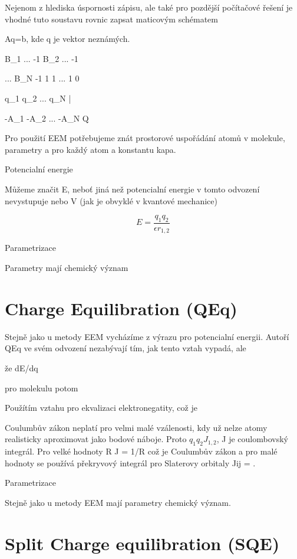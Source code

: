 \documentclass[10pt,draft,oneside]{fithesis2}
\begin{document}
Nejenom z hlediska úspornosti zápisu, ale také pro pozdější počítačové řešení je vhodné tuto soustavu rovnic zapsat maticovým schématem

Aq=b, kde q je vektor neznámých.

B_1  ...  -1
 B_2 ...  -1

  ... B_N -1
1 1 ... 1 0

q_1
q_2
...
q_N
\bar{\xi}

-A_1
-A_2
...
-A_N
Q



Pro použití EEM potřebujeme znát prostorové uspořádání atomů v molekule, parametry a pro každý atom a konstantu kapa.

Potencialní energie

Můžeme značit E, neboť jiná než potencialní energie v tomto odvození nevystupuje nebo V (jak je obvyklé v kvantové mechanice)

$$E=\frac{q_1 q_2}{\epsilon r_{1,2}}$$

Parametrizace

Parametry mají chemický význam

\section{Charge Equilibration (QEq)}

Stejně jako u metody EEM vycházíme z výrazu pro potencialní energii. Autoří QEq ve svém odvození nezabývají tím, jak tento vztah vypadá, ale 

že dE/dq

pro molekulu potom


Použítím vztahu pro ekvalizaci elektronegatity, což je 

Coulumbův zákon neplatí pro velmi malé vzálenosti, kdy už nelze atomy realisticky aproximovat jako bodové náboje. Proto  $q_1 q_2 J_{1,2}$, J je coulombovský integrál. Pro velké hodnoty R J = 1/R což je Coulumbův zákon a pro malé hodnoty se používá překryvový integrál pro Slaterovy orbitaly Jij = .

Parametrizace

Stejně jako u metody EEM mají parametry chemický význam.

\section{Split Charge equilibration (SQE)}
\end{document}
